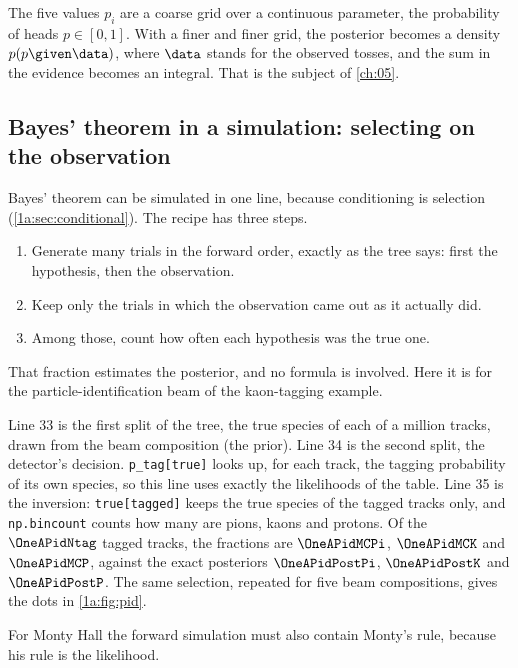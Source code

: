 The five values $p_i$ are a coarse grid over a continuous parameter, the
probability of heads $p\in[0,1]$. With a finer and finer grid, the posterior
becomes a density $p(p\given\data)$, where $\data$ stands for the observed
tosses, and the sum in the evidence becomes an integral. That is the subject of
\cref{ch:05}.

\subsection{Bayes' theorem in a simulation: selecting on the observation}

Bayes' theorem can be simulated in one line, because conditioning is selection
(\cref{1a:sec:conditional}). The recipe has three steps.
\begin{enumerate}[leftmargin=2em,itemsep=1pt]
  \item Generate many trials in the forward order, exactly as the tree says:
        first the hypothesis, then the observation.
  \item Keep only the trials in which the observation came out as it actually
        did.
  \item Among those, count how often each hypothesis was the true one.
\end{enumerate}
That fraction estimates the posterior, and no formula is involved. Here it is
for the particle-identification beam of the kaon-tagging example.


Line 33 is the first split of the tree, the true species of each of a million
tracks, drawn from the beam composition (the prior). Line 34 is the second
split, the detector's decision. \texttt{p\_tag[true]} looks up, for each track,
the tagging probability of its own species, so this line uses exactly the
likelihoods of the table. Line 35 is the inversion: \texttt{true[tagged]} keeps
the true species of the tagged tracks only, and \texttt{np.bincount} counts how
many are pions, kaons and protons. Of the $\OneAPidNtag$ tagged tracks, the
fractions are $\OneAPidMCPi$, $\OneAPidMCK$ and $\OneAPidMCP$, against the exact
posteriors $\OneAPidPostPi$, $\OneAPidPostK$ and $\OneAPidPostP$. The same selection,
repeated for five beam compositions, gives the dots in \cref{1a:fig:pid}.

For Monty Hall the forward simulation must also contain Monty's rule, because
his rule is the likelihood.

